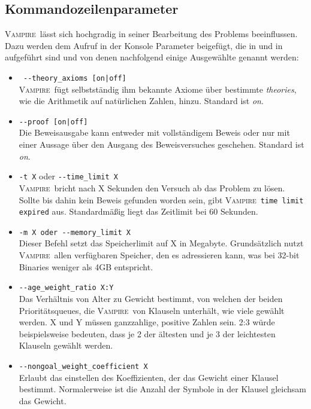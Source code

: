 \documentclass{article}
\newcommand{\vampire}{\textsc{Vampire}~}
\begin{document}
\subsection{Kommandozeilenparameter}
\label{subsec:commands}
\vampire lässt sich hochgradig in seiner Bearbeitung des Problems beeinflussen. Dazu werden dem Aufruf in der Konsole Parameter beigefügt, die in \cite{cav2013} und in \cite[S. 2, 20]{hoder2011slides} aufgeführt sind und von denen nachfolgend einige Ausgewählte genannt werden:
\begin{itemize}	
	\item \verb= --theory_axioms [on|off]= \label{arg:theoryaxiomsoff}\\
	\vampire fügt selbstständig ihm bekannte Axiome über bestimmte \emph{theories}, wie die Arithmetik auf natürlichen Zahlen, hinzu. Standard ist \textit{on}.
	\item \verb=--proof [on|off]= \label{arg:proofoff}\\
	Die Beweisausgabe kann entweder mit vollständigem Beweis oder nur mit einer Aussage über den Ausgang des Beweisversuches geschehen. Standard ist \textit{on}.
	\item \verb|-t X| oder \verb|--time_limit X| \label{arg:timelimit}\\
	\vampire bricht nach X Sekunden den Versuch ab das Problem zu lösen. Sollte bis dahin kein Beweis gefunden worden sein, gibt \vampire \texttt{time limit expired} aus. Standardmäßig liegt das Zeitlimit bei 60  Sekunden.
	\item \verb|-m X oder --memory_limit X| \label{arg:memorylimit}\\
	Dieser Befehl setzt das Speicherlimit auf X in Megabyte. Grundsätzlich nutzt \vampire allen verfügbaren Speicher, den es adressieren kann, was bei 32-bit Binaries weniger als 4GB entspricht.
	\item \verb|--age_weight_ratio X:Y| \label{arg:ageweightratio}\\
	Das Verhältnis von Alter zu Gewicht bestimmt, von welchen der beiden Prioritätsqueues, die \vampire von Klauseln unterhält, wie viele gewählt werden. X und Y müssen ganzzahlige, positive Zahlen sein.
	2:3 würde beispielsweise bedeuten, dass je 2 der ältesten und je 3 der leichtesten Klauseln gewählt werden.  
	\item \verb|--nongoal_weight_coefficient X| \label{arg:weightcoefficient}\\
	Erlaubt das einstellen des Koeffizienten, der das Gewicht einer Klausel bestimmt. Normalerweise ist die Anzahl der Symbole in der Klausel gleichsam das Gewicht.

\end{itemize}
\end{document}
